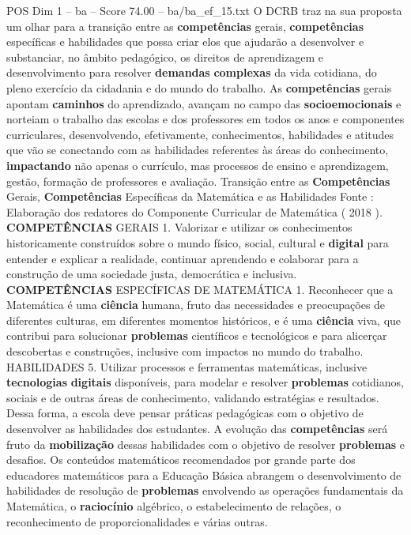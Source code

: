 \begin{textsample}{POS Dim 1 – ba – Score 74.00 – ba/ba\_ef\_15.txt}
O DCRB traz na sua proposta um olhar para a transição entre as \textbf{competências} gerais, \textbf{competências} específicas e habilidades que possa criar elos que ajudarão a desenvolver e substanciar, no âmbito pedagógico, os direitos de aprendizagem e desenvolvimento para resolver \textbf{demandas} \textbf{complexas} da vida cotidiana, do pleno exercício da cidadania e do mundo do trabalho.
As \textbf{competências} gerais apontam \textbf{caminhos} do aprendizado, avançam no campo das \textbf{socioemocionais} e norteiam o trabalho das escolas e dos professores em todos os anos e componentes curriculares, desenvolvendo, efetivamente, conhecimentos, habilidades e atitudes que vão se conectando com as habilidades referentes às áreas do conhecimento, \textbf{impactando} não apenas o currículo, mas processos de ensino e aprendizagem, gestão, formação de professores e avaliação.
Transição entre as \textbf{Competências} Gerais, \textbf{Competências} Específicas da Matemática e as Habilidades Fonte : Elaboração dos redatores do Componente Curricular de Matemática ( 2018 ). \textbf{COMPETÊNCIAS} GERAIS 1.
Valorizar e utilizar os conhecimentos historicamente construídos sobre o mundo físico, social, cultural e \textbf{digital} para entender e explicar a realidade, continuar aprendendo e colaborar para a construção de uma sociedade justa, democrática e inclusiva. \textbf{COMPETÊNCIAS} ESPECÍFICAS DE MATEMÁTICA 1.
Reconhecer que a Matemática é uma \textbf{ciência} humana, fruto das necessidades e preocupações de diferentes culturas, em diferentes momentos históricos, e é uma \textbf{ciência} viva, que contribui para solucionar \textbf{problemas} científicos e tecnológicos e para alicerçar descobertas e construções, inclusive com impactos no mundo do trabalho.
HABILIDADES 5.
Utilizar processos e ferramentas matemáticas, inclusive \textbf{tecnologias} \textbf{digitais} disponíveis, para modelar e resolver \textbf{problemas} cotidianos, sociais e de outras áreas de conhecimento, validando estratégias e resultados.
Dessa forma, a escola deve pensar práticas pedagógicas com o objetivo de desenvolver as habilidades dos estudantes.
A evolução das \textbf{competências} será fruto da \textbf{mobilização} dessas habilidades com o objetivo de resolver \textbf{problemas} e desafios.
Os conteúdos matemáticos recomendados por grande parte dos educadores matemáticos para a Educação Básica abrangem o desenvolvimento de habilidades de resolução de \textbf{problemas} envolvendo as operações fundamentais da Matemática, o \textbf{raciocínio} algébrico, o estabelecimento de relações, o reconhecimento de proporcionalidades e várias outras.

\end{textsample}
